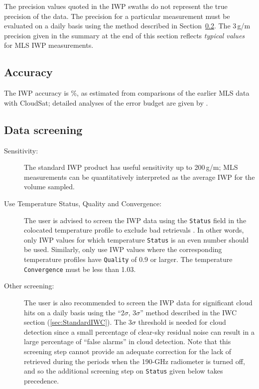 The precision values quoted in the IWP swaths do not represent the true precision of the data. The precision for a particular measurement must be evaluated on a daily basis using the method described in Section~\ref{sec:IWPScreening}. The 3\,g/m precision given in the summary at the end of this section reflects \emph{typical values} for MLS IWP measurements.

\subsection{Accuracy}

The IWP accuracy is \%, as estimated from comparisons of the earlier \vii MLS data with CloudSat; detailed analyses of the \vii error budget are given by \citet{WuEtal:2009}.

\begin{nofloatpages}
\subsection{Data screening}
\label{sec:IWPScreening}
\begin{description}
  \item[Sensitivity:] The standard IWP product has useful sensitivity up to 200\,g/m; MLS measurements can be quantitatively interpreted as the average IWP for the volume sampled.
  \item[Use Temperature Status, Quality and Convergence:] The user is advised to screen the IWP data using the \texttt{Status} field in the colocated temperature profile to exclude bad retrievals \citep{SchwartzEtal:2008:Validation}. In other words, only IWP values for which temperature \texttt{Status} is an even number should be used. Similarly, only use IWP values where the corresponding temperature profiles have \texttt{Quality} of 0.9 or larger. The temperature \texttt{Convergence} must be less than 1.03.
  
  \item[Other screening:] The user is also recommended to screen the IWP data for significant cloud hits on a daily basis using the ``2$\sigma$, $3\sigma$'' method described in the IWC section (\ref{sec:StandardIWC}). The $3\sigma$ threshold is needed for cloud detection since a small percentage of clear-sky residual noise can result in a large percentage of ``false alarms'' in cloud detection.  Note that this screening step cannot provide an adequate correction for the lack of retrieved  during the periods when the \mbox{190\nobreakdash-GHz} radiometer is turned off, and so the additional screening step on  \texttt{Status} given below takes precedence.
  

\end{description}
\end{nofloatpages}
